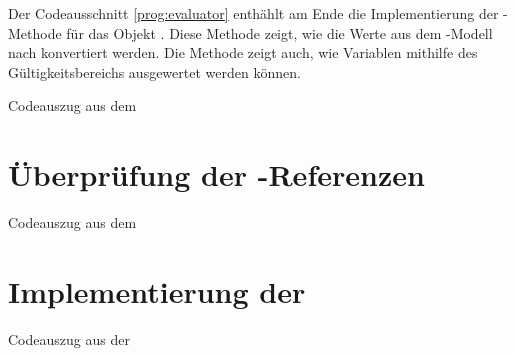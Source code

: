 \SuperPar
Der Codeausschnitt \ref{prog:evaluator} enthählt am Ende die Implementierung der -Methode für das Objekt . Diese Methode zeigt, wie die Werte aus dem -Modell nach  konvertiert werden. Die Methode zeigt auch, wie Variablen mithilfe des Gültigkeitsbereichs ausgewertet werden können.

\begin{program}

\caption{Codeauszug aus dem }
\label{prog:evaluator}
\end{program}

\clearpage
\section{Überprüfung der -Referenzen}
\label{cha:validateKeyword}

\begin{program}

\caption{Codeauszug aus dem }
\label{prog:validator}
\end{program}


\section{Implementierung der }
\label{cha:implementJSA}

\begin{program}

\caption{Codeauszug aus der }
\label{prog:scriptEngine}
\end{program}

\todo

